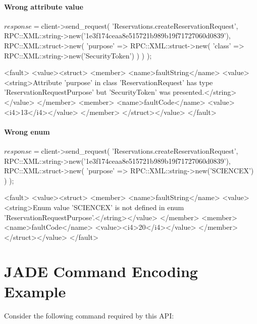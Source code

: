 \subsubsection{Wrong attribute value}
\begin{PerlCmd}
$response = $client->send_request(
    'Reservations.createReservationRequest',
    RPC::XML::string->new('1e3f174ceaa8e515721b989b19f71727060d0839'),
    RPC::XML::struct->new(
        'purpose' => RPC::XML::struct->new(
            'class' => RPC::XML::string->new('SecurityToken')
        )
    )
);
\end{PerlCmd}
\begin{PerlResponse}
<fault>
  <value><struct>
    <member>
      <name>faultString</name>
      <value><string>Attribute 'purpose' in class 'ReservationRequest' has type
          'ReservationRequestPurpose' but 'SecurityToken' was presented.</string></value>
    </member>
    <member>
      <name>faultCode</name>
      <value><i4>13</i4></value>
    </member>
  </struct></value>
</fault>
\end{PerlResponse}

\subsubsection{Wrong enum}
\begin{PerlCmd}
$response = $client->send_request(
    'Reservations.createReservationRequest',
    RPC::XML::string->new('1e3f174ceaa8e515721b989b19f71727060d0839'),
    RPC::XML::struct->new(
        'purpose' => RPC::XML::string->new('SCIENCEX')
    )
);
\end{PerlCmd}
\begin{PerlResponse}
<fault>
  <value><struct>
    <member>
      <name>faultString</name>
      <value><string>Enum value 'SCIENCEX' is not defined in enum
          'ReservationRequestPurpose'.</string></value>
    </member>
    <member>
      <name>faultCode</name>
      <value><i4>20</i4></value>
    </member>
  </struct></value>
</fault>
\end{PerlResponse}

\chapter{JADE Command Encoding Example} \label{appendix:jade-command-encoding}

Consider the following command required by this API:
\begin{Api}
\end{Api}

